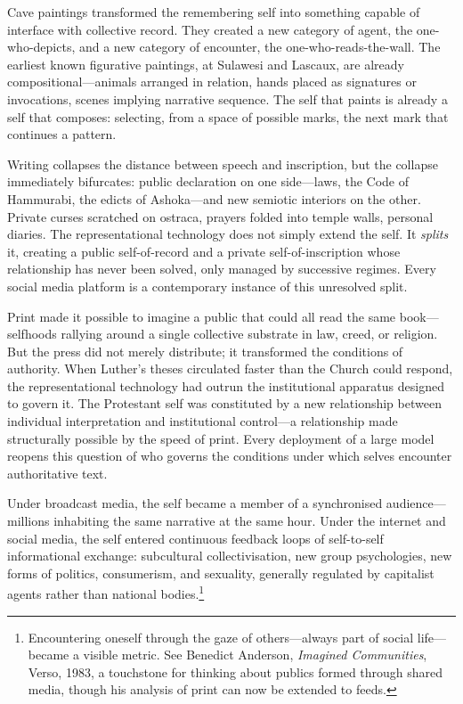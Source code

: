 Cave paintings transformed the remembering self into something capable of interface with collective record. They created a new category of agent, the one-who-depicts, and a new category of encounter, the one-who-reads-the-wall. The earliest known figurative paintings, at Sulawesi and Lascaux, are already compositional---animals arranged in relation, hands placed as signatures or invocations, scenes implying narrative sequence. The self that paints is already a self that composes: selecting, from a space of possible marks, the next mark that continues a pattern.

Writing collapses the distance between speech and inscription, but the collapse immediately bifurcates: public declaration on one side---laws, the Code of Hammurabi, the edicts of Ashoka---and new semiotic interiors on the other. Private curses scratched on ostraca, prayers folded into temple walls, personal diaries. The representational technology does not simply extend the self. It \textit{splits} it, creating a public self-of-record and a private self-of-inscription whose relationship has never been solved, only managed by successive regimes. Every social media platform is a contemporary instance of this unresolved split.

Print made it possible to imagine a public that could all read the same book---selfhoods rallying around a single collective substrate in law, creed, or religion. But the press did not merely distribute; it transformed the conditions of authority. When Luther's theses circulated faster than the Church could respond, the representational technology had outrun the institutional apparatus designed to govern it. The Protestant self was constituted by a new relationship between individual interpretation and institutional control---a relationship made structurally possible by the speed of print. Every deployment of a large model reopens this question of who governs the conditions under which selves encounter authoritative text.

Under broadcast media, the self became a member of a synchronised audience---millions inhabiting the same narrative at the same hour. Under the internet and social media, the self entered continuous feedback loops of self-to-self informational exchange: subcultural collectivisation, new group psychologies, new forms of politics, consumerism, and sexuality, generally regulated by capitalist agents rather than national bodies.\footnote{Encountering oneself through the gaze of others---always part of social life---became a visible metric. See Benedict Anderson, \emph{Imagined Communities}, Verso, 1983, a touchstone for thinking about publics formed through shared media, though his analysis of print can now be extended to feeds.}

